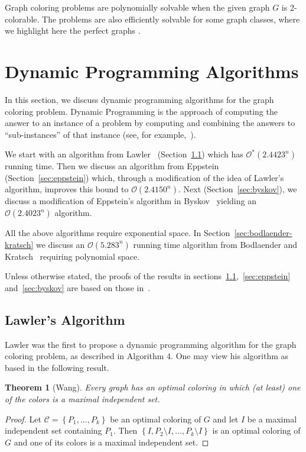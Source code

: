 \documentclass[fleqn,10pt]{SelfArx} %
\newtheorem{teor}{Theorem}
\newcommand{\chaves}[1] {\ensuremath{{\left \{ {#1} \right \}}}}
\newcommand{\cC}{\mathcal{C}}
\newcommand{\cO}{\mathcal{O}}
\begin{document}
	Graph coloring problems are polynomially solvable when the given graph $G$ is 2-colorable. The problems are also efficiently solvable for some graph classes, where we highlight here the perfect graphs \cite{Grotschel84}.
	
	\section{Dynamic Programming Algorithms}\label{sec:dyn}
	
	In this section, we discuss dynamic programming algorithms for the
	graph coloring problem. Dynamic Programming is the approach of
	computing the answer to an instance of a problem by computing and
	combining the answers to ``sub-instances'' of that instance (see, for
	example,~\cite[chapter 15]{CormenLeisersonRivestStein09}).
	
	We start with an algorithm from Lawler~\cite{Lawler76} (Section~\ref{sec:lawler}) which has $\cO^*(2.4423^n)$ running
	time. Then we discuss an algorithm from Eppstein~\cite{Eppstein03}
	(Section~\ref{sec:eppstein}) which, through a modification of the idea
	of Lawler's algorithm, improves this bound to
	$\cO(2.4150^n)$. Next (Section~\ref{sec:byskov}), we discuss a
	modification of Eppstein's algorithm in Byskov~\cite{Byskov03} yielding
	an $\cO(2.4023^n)$ algorithm. 
	
	All the above algorithms require exponential space. In
	Section~\ref{sec:bodlaender-kratsch} we discuss an
	$\cO(5.283^n)$ running time algorithm
	from Bodlaender and Kratsch~\cite{BodlaenderKratsch06} requiring polynomial space.
	
	Unless otherwise stated, the proofs of the results in
	sections~\ref{sec:lawler},~\ref{sec:eppstein} and~\ref{sec:byskov} are
	based on those in~\cite{Byskov03}.
	
	\subsection{Lawler's Algorithm}\label{sec:lawler}
	
	Lawler\cite{Lawler76} was the first to propose a dynamic programming
	algorithm for the graph coloring problem, as described in Algorithm 4. One may view his algorithm as based in the following result.
	
	\begin{teor}[Wang\cite{Wang1974}]\label{teo:wang} 
		Every graph has an optimal coloring in which (at least) one of the
		colors is a maximal independent set.
	\end{teor}
	\begin{proof}
		Let $\cC = \chaves{P_1, \ldots,P_k}$ be an optimal coloring of $G$ and
		let $I$ be a maximal independent set containing $P_{1}$. Then
		$\chaves{I, P_2 \setminus I, \ldots,P_k \setminus I}$ is an optimal coloring of
		$G$ and one of its colors is a maximal independent set.
	\end{proof}
	
\end{document}
